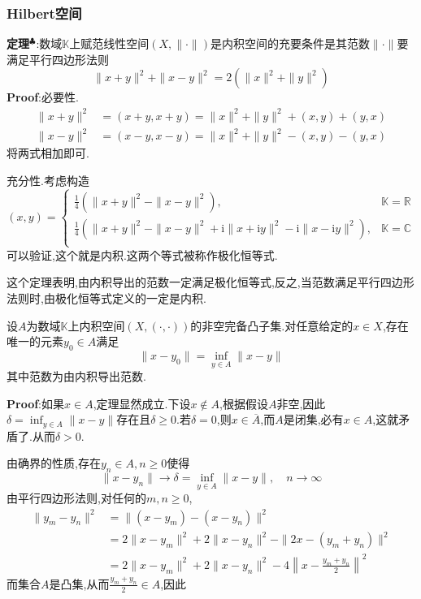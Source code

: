 \subsubsection{Hilbert空间}
\textbf{定理}$^\clubsuit $:数域$\mathbb{K}$上赋范线性空间$(X,\|\cdot\|)$是内积空间的充要条件是其范数$\|\cdot\|$要满足平行四边形法则
$$
\|x+y\|^2+\|x-y\|^2=2(\|x\|^2+\|y\|^2)
$$
\qquad \textbf{Proof}:必要性.
$$
\begin{aligned}
    \|x+y\|^2 &= (x+y,x+y) = \|x\|^2+\|y\|^2+(x,y)+(y,x)\\
    \|x-y\|^2 &= (x-y,x-y) = \|x\|^2+\|y\|^2-(x,y)-(y,x)
\end{aligned}
$$
将两式相加即可.\par
充分性.考虑构造
$$
(x,y)=
\begin{cases}
    \frac{1}{4}\left(\|x+y\|^2-\|x-y\|^2\right),&\mathbb{K}=\mathbb{R}\\[5pt]
    \frac{1}{4}\left(\|x+y\|^2-\|x-y\|^2+\mathrm{i}\|x+\mathrm{i}y\|^2-\mathrm{i}\|x-\mathrm{i}y\|^2\right),&\mathbb{K}=\mathbb{C}\\
\end{cases}
$$
可以验证,这个就是内积.这两个等式被称作极化恒等式.\par
这个定理表明,由内积导出的范数一定满足极化恒等式,反之,当范数满足平行四边形法则时,由极化恒等式定义的一定是内积.
\begin{tcolorbox}[colback=KuangNei,colframe=BianKuang,title=\textbf{极小化向量定理},sharpish corners]
    设$A$为数域$\mathbb{K}$上内积空间$(X,(\cdot,\cdot))$的非空完备凸子集.对任意给定的$x\in X$,存在唯一的元素$y_0\in A$满足
    $$
    \|x-y_0\|=\inf_{y\in A}\|x-y\|
    $$
    其中范数为由内积导出范数.
\end{tcolorbox}
\textbf{Proof}:如果$x\in A$,定理显然成立.下设$x\notin A$,根据假设$A$非空,因此$\delta=\inf_{y\in A}\|x-y\|$存在且$\delta\geqslant 0$.若$\delta= 0$,则$x\in\overline{A}$,而$A$是闭集,必有$x\in A$,这就矛盾了.从而$\delta>0$.\par
由确界的性质,存在$y_n\in A,n\geqslant 0$使得
$$
\|x-y_n\|\to \delta=\inf_{y\in A}\|x-y\|,\quad n\to\infty
$$
由平行四边形法则,对任何的$m,n\geqslant 0$,
$$
\begin{aligned}
    \|y_m-y_n\|^2 &=\|(x-y_m)-(x-y_n)\|^2\\
                  &= 2\|x-y_m\|^2+2\|x-y_n\|^2-\|2x-(y_m+y_n)\|^2\\
                  &= 2\|x-y_m\|^2+2\|x-y_n\|^2-4\left\|x-\frac{y_m+y_n}{2}\right\|^2
\end{aligned}
$$
而集合$A$是凸集,从而$\frac{y_m+y_n}{2}\in A$,因此
